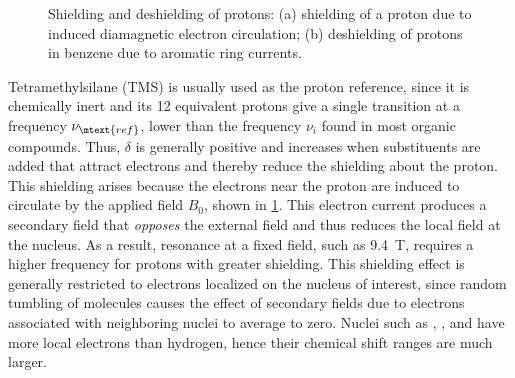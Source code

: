 \documentclass[nobib,nofonts,nols,nohyper]{tufte-handout}
\begin{document}
\begin{figure}[htb]
  \centering
  
  \caption{Shielding and deshielding of protons: (a) shielding of a proton due to induced diamagnetic electron circulation; (b) deshielding of protons in benzene due to aromatic ring currents.}
  \label{fig:shielding}
\end{figure}
  
Tetramethylsilane (TMS) is usually used as the proton reference, since it is chemically inert and its 12 equivalent protons give a single transition at a frequency \( \nu_\mtext{ref} \), lower than the frequency \( \nu_i \) found in most organic compounds. 
Thus, \( \delta \) is generally positive and increases when substituents are added that attract electrons and thereby reduce the shielding about the proton. 
This shielding arises because the electrons near the proton are induced to circulate by the applied field \( B_0 \), shown in \cref{fig:shielding}. 
This electron current produces a secondary field that \emph{opposes} the external field and thus reduces the local field at the nucleus. 
As a result, resonance at a fixed field, such as \SI{9.4}{\tesla}, requires a higher frequency for protons with greater shielding. 
This shielding effect is generally restricted to electrons localized on the nucleus of interest, since random tumbling of molecules causes the effect of secondary fields due to electrons associated with neighboring nuclei to average to zero. 
Nuclei such as , , and  have more local electrons than hydrogen, hence their chemical shift ranges are much larger. 
\end{document}
